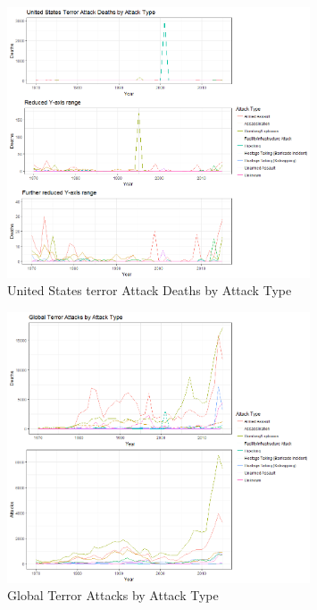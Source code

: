 \documentclass[10pt,a4paper]{article}
\begin{document}
\begin{center}
\begin{figure}[H]
		
	\includegraphics[width=0.8\textwidth]{Plots/AttackType/Deaths.png}
	\caption{United States terror Attack Deaths by Attack Type}
	
\end{figure}

\begin{figure}[H]

		
	\includegraphics[width=0.8\textwidth]{Plots/AttackType/Global.png}
	\caption{Global Terror Attacks by Attack Type}
	
\end{figure}

\begin{figure}[H]


\end{figure}
\end{center}
\end{document}
